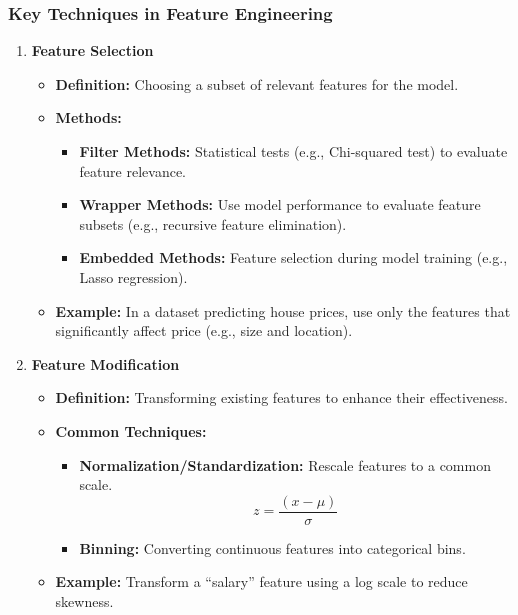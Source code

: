 \documentclass{beamer}
\begin{document}
\begin{frame}[fragile]
    \frametitle{Key Techniques in Feature Engineering}
    \begin{enumerate}
        \item \textbf{Feature Selection}
            \begin{itemize}
                \item \textbf{Definition:} Choosing a subset of relevant features for the model.
                \item \textbf{Methods:}
                    \begin{itemize}
                        \item \textbf{Filter Methods:} Statistical tests (e.g., Chi-squared test) to evaluate feature relevance.
                        \item \textbf{Wrapper Methods:} Use model performance to evaluate feature subsets (e.g., recursive feature elimination).
                        \item \textbf{Embedded Methods:} Feature selection during model training (e.g., Lasso regression).
                    \end{itemize}
                \item \textbf{Example:} In a dataset predicting house prices, use only the features that significantly affect price (e.g., size and location).
            \end{itemize}

        \item \textbf{Feature Modification}
            \begin{itemize}
                \item \textbf{Definition:} Transforming existing features to enhance their effectiveness.
                \item \textbf{Common Techniques:}
                    \begin{itemize}
                        \item \textbf{Normalization/Standardization:} Rescale features to a common scale.
                            \begin{equation}
                                z = \frac{(x - \mu)}{\sigma}
                            \end{equation}
                        \item \textbf{Binning:} Converting continuous features into categorical bins.
                    \end{itemize}
                \item \textbf{Example:} Transform a “salary” feature using a log scale to reduce skewness.
            \end{itemize}
    \end{enumerate}
\end{frame}
\end{document}
